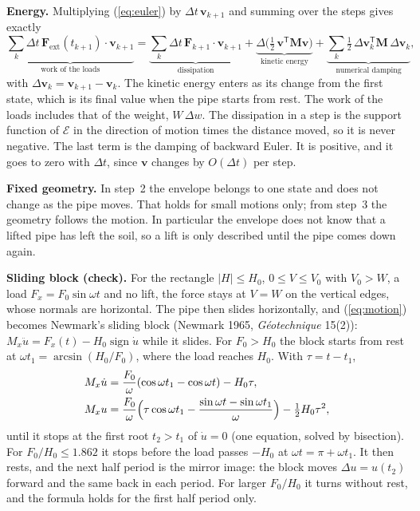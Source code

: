 \documentclass[11pt,a4paper]{article}
\begin{document}
\textbf{Energy.}  Multiplying (\ref{eq:euler}) by
$\Delta t\,\mathbf{v}_{k+1}$ and summing over the steps gives exactly
\begin{equation}
  \underbrace{\sum_k \Delta t\,\mathbf{F}_\text{ext}(t_{k+1})\cdot\mathbf{v}_{k+1}}_{\text{work of the loads}}
  = \underbrace{\sum_k \Delta t\,\mathbf{F}_{k+1}\cdot\mathbf{v}_{k+1}}_{\text{dissipation}}
  + \underbrace{\Delta\bigl(\tfrac12\,\mathbf{v}^\mathsf{T}\mathbf{M}\mathbf{v}\bigr)}_{\text{kinetic energy}}
  + \underbrace{\sum_k \tfrac12\,\Delta\mathbf{v}_k^\mathsf{T}\mathbf{M}\,\Delta\mathbf{v}_k}_{\text{numerical damping}},
  \label{eq:energy}
\end{equation}
with $\Delta\mathbf{v}_k = \mathbf{v}_{k+1} - \mathbf{v}_k$.  The kinetic
energy enters as its change from the first state, which is its final
value when the pipe starts from rest.  The work of the loads includes
that of the weight, $W\,\Delta w$.  The
dissipation in a step is the support function of $\mathcal{E}$ in the
direction of motion times the distance moved, so it is never negative.
The last term is the damping of backward Euler.  It is positive, and
it goes to zero with $\Delta t$, since $\mathbf{v}$ changes by
$O(\Delta t)$ per step.

\textbf{Fixed geometry.}  In step~2 the envelope belongs to one state
and does not change as the pipe moves.  That holds for small motions
only; from step~3 the geometry follows the motion.  In particular the
envelope does not know that a lifted pipe has left the soil, so a lift
is only described until the pipe comes down again.

\textbf{Sliding block (check).}  For the rectangle $|H| \le H_0$,
$0 \le V \le V_0$ with $V_0 > W$, a load $F_x = F_0\sin\omega t$ and no
lift, the force stays at $V = W$ on the vertical edges, whose normals
are horizontal.  The pipe then slides horizontally, and
(\ref{eq:motion}) becomes Newmark's sliding block (Newmark 1965,
\emph{G\'eotechnique} 15(2)):
$M_x\ddot u = F_x(t) - H_0\operatorname{sign}\dot u$ while it slides.
For $F_0 > H_0$ the block starts from rest at
$\omega t_1 = \arcsin(H_0/F_0)$, where the load reaches $H_0$.  With
$\tau = t - t_1$,
\begin{align}
  M_x\dot u &= \frac{F_0}{\omega}(\cos\omega t_1 - \cos\omega t)
    - H_0\tau, \\
  M_x u &= \frac{F_0}{\omega}\Bigl(\tau\cos\omega t_1
    - \frac{\sin\omega t - \sin\omega t_1}{\omega}\Bigr)
    - \tfrac12 H_0\tau^2,
\end{align}
until it stops at the first root $t_2 > t_1$ of $\dot u = 0$ (one
equation, solved by bisection).  For $F_0/H_0 \le 1.862$ it stops
before the load passes $-H_0$ at $\omega t = \pi + \omega t_1$.  It
then rests, and the next half period is the mirror image: the block
moves $\Delta u = u(t_2)$ forward and the same back in each period.
For larger $F_0/H_0$ it turns without rest, and the formula holds for
the first half period only.
\end{document}
